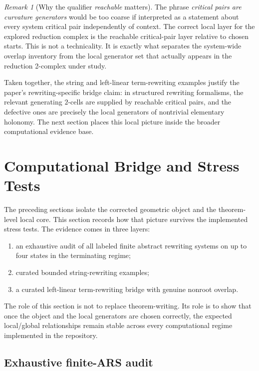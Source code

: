 \documentclass[11pt]{article}
\numberwithin{equation}{section}
\theoremstyle{definition}
\theoremstyle{remark}
\newtheorem{remark}[theorem]{Remark}
\begin{document}
\begin{remark}[Why the qualifier \emph{reachable} matters]
\label{rem:reachable-critical-pairs-matter}
The phrase \emph{critical pairs are curvature generators} would be too coarse if interpreted as a statement about every system critical pair independently of context. The correct local layer for the explored reduction complex is the reachable critical-pair layer relative to chosen starts. This is not a technicality. It is exactly what separates the system-wide overlap inventory from the local generator set that actually appears in the reduction 2-complex under study.
\end{remark}

Taken together, the string and left-linear term-rewriting examples justify the paper's rewriting-specific bridge claim: in structured rewriting formalisms, the relevant generating $2$-cells are supplied by reachable critical pairs, and the defective ones are precisely the local generators of nontrivial elementary holonomy. The next section places this local picture inside the broader computational evidence base.
 \section{Computational Bridge and Stress Tests}
\label{sec:computational-bridge}

The preceding sections isolate the corrected geometric object and the theorem-level local core. This section records how that picture survives the implemented stress tests. The evidence comes in three layers:
\begin{enumerate}
    \item an exhaustive audit of all labeled finite abstract rewriting systems on up to four states in the terminating regime;
    \item curated bounded string-rewriting examples;
    \item a curated left-linear term-rewriting bridge with genuine nonroot overlap.
\end{enumerate}
The role of this section is not to replace theorem-writing. Its role is to show that once the object and the local generators are chosen correctly, the expected local/global relationships remain stable across every computational regime implemented in the repository.

\subsection{Exhaustive finite-ARS audit}
\label{subsec:exhaustive-finite-ars-audit}
\end{document}
